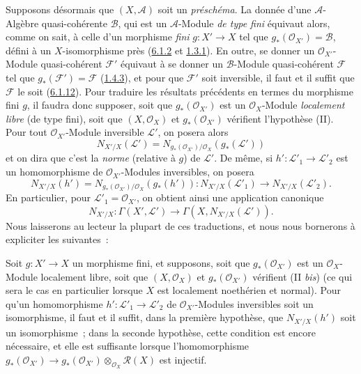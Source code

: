 \begin{env}[6.5.5]
\label{II.6.5.5-fr}
Supposons désormais que $(X,\mathcal{A})$ soit un \emph{préschéma}. La donnée
d'une $\mathcal{A}$-Algèbre quasi-cohérente $\mathcal{B}$, qui est un
$\mathcal{A}$-Module \emph{de type fini} équivaut alors, comme on sait, à
celle d'un morphisme \emph{fini} $g:X'\to X$ tel que
$g_*(\mathcal{O}_{X'})=\mathcal{B}$, défini à un $X$-isomorphisme près
(\hyperref[II.6.1.2-fr]{6.1.2} et \hyperref[II.1.3.1-fr]{1.3.1}). En outre,
se donner un $\mathcal{O}_{X'}$-Module quasi-cohérent $\mathcal{F}'$ équivaut
à se donner un $\mathcal{B}$-Module quasi-cohérent $\mathcal{F}$ tel que
$g_*(\mathcal{F}')=\mathcal{F}$ (\hyperref[II.1.4.3-fr]{1.4.3}), et pour que
$\mathcal{F}'$ soit inversible, il faut et il suffit que $\mathcal{F}$ le soit
(\hyperref[II.6.1.12-fr]{6.1.12}). Pour traduire les résultats précédents en
termes du morphisme fini $g$, il faudra donc supposer, soit que
$g_*(\mathcal{O}_{X'})$ est un $\mathcal{O}_X$-Module \emph{localement libre}
(de type fini), soit que $(X,\mathcal{O}_X)$ et $g_*(\mathcal{O}_{X'})$
vérifient l'hypothèse (II). Pour tout $\mathcal{O}_{X'}$-Module inversible
$\mathcal{L}'$, on posera alors
\[
\label{II.6.5.5.1-fr}
N_{X'/X}(\mathcal{L}')
=N_{g_*(\mathcal{O}_{X'})/\mathcal{O}_X}(g_*(\mathcal{L}'))
\tag{6.5.5.1}
\]
et on dira que c'est la \emph{norme} (relative à $g$) de $\mathcal{L}'$. De
même, si $h':\mathcal{L}'_1\to\mathcal{L}'_2$ est un homomorphisme de
$\mathcal{O}_{X'}$-Modules inversibles, on posera
\[
\label{II.6.5.5.2-fr}
N_{X'/X}(h')
=N_{g_*(\mathcal{O}_{X'})/\mathcal{O}_X}(g_*(h')):
N_{X'/X}(\mathcal{L}'_1)\to N_{X'/X}(\mathcal{L}'_2).
\tag{6.5.5.2}
\]
En particulier, pour $\mathcal{L}'_1=\mathcal{O}_{X'}$, on obtient ainsi une
application canonique
\[
\label{II.6.5.5.3-fr}
N_{X'/X}:\Gamma(X',\mathcal{L}')
\to\Gamma(X,N_{X'/X}(\mathcal{L}')).
\tag{6.5.5.3}
\]
Nous laisserons au lecteur la plupart de ces traductions, et nous nous bornerons à
expliciter les suivantes~:
\end{env}

\begin{proposition}[6.5.6]
\label{II.6.5.6-fr}
Soit $g:X'\to X$ un morphisme fini, et supposons, soit que
$g_*(\mathcal{O}_{X'})$ est un $\mathcal{O}_X$-Module localement libre, soit
que $(X,\mathcal{O}_X)$ et $g_*(\mathcal{O}_{X'})$ vérifient (II \emph{bis})
(ce qui sera le cas en particulier lorsque $X$ est localement noethérien et
normal). Pour qu'un homomorphisme $h':\mathcal{L}'_1\to\mathcal{L}'_2$ de
$\mathcal{O}_{X'}$-Modules inversibles soit un isomorphisme, il faut et il
suffit, dans la première hypothèse, que $N_{X'/X}(h')$ soit un isomorphisme~;
dans la seconde hypothèse, cette condition est encore nécessaire, et elle est
suffisante lorsque l'homomorphisme
$g_*(\mathcal{O}_{X'})\to
g_*(\mathcal{O}_{X'})\otimes_{\mathcal{O}_X}\mathcal{R}(X)$ est injectif.
\end{proposition}

